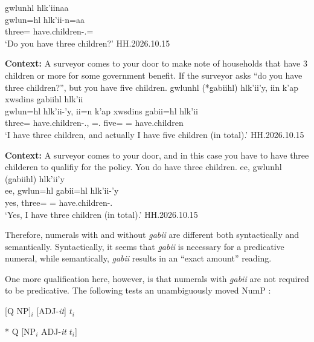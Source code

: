 \documentclass{article}
\begin{document}
\begin{exe}
    \ex 
    \begin{xlist}
        \item \glll gwlunhl hlk'iinaa \\
    gwlun=hl hlk'ii-n=aa \\
    three=\Cn{} have.children-\Ssg{}.\Ii{}=\Q{} \\
    `Do you have three children?' \hfill HH.2026.10.15
       \item \textbf{Context:} A surveyor comes to your door to make note of households that have 3 children or more for some government benefit. If the surveyor asks ``do you have three children?'', but you have five children. 
        \glll gwlunhl (*g̱abiihl) hlk'ii'y, iin k'ap xwsdins g̱abiihl hlk'ii  \\
    gwlun=hl hlk'ii-'y, ii=n k'ap xwsdins g̱abii=hl hlk'ii  \\
    three=\Cn{} have.children-\Fsg{}.\Ii{}, \Ccnj{}=\Fsg{}.\I{} \Verum{} five=\Cn{} \Cnt{}=\Cn{} have.children \\
    `I have three children, and actually I have five children (in total).' \hfill HH.2026.10.15
    \item \textbf{Context:} A surveyor comes to your door, and in this case you have to have three childeren to qualifiy for the policy. You do have three children. 
        \glll ee, gwlunhl (g̱abiihl) hlk'ii'y \\
    ee, gwlun=hl g̱abii=hl hlk'ii-'y \\
    yes, three=\Cn{} \Cnt{}=\Cn{} have.children-\Fsg{}.\Ii{} \\
    `Yes, I have three children (in total).' \hfill HH.2026.10.15
    \end{xlist}
\end{exe}

Therefore, numerals with and without \textit{g̱abii} are different both syntactically and semantically. Syntactically, it seems that \textit{g̱abii} is necessary for a predicative numeral, while semantically, \textit{g̱abii} results in an ``exact amount'' reading.

One more qualification here, however, is that numerals with \textit{g̱abii} are not required to be predicative. The following tests an unambiguously moved NumP \parencite{forbesAdjectives2012}:

\begin{exe}
    \ex \begin{xlist}
        \item {} [Q NP]$_{i}$ [ADJ-\textit{it}] $t_{i}$
        \item {} * Q [NP$_{i}$ ADJ-\textit{it} $t_{i}$]
    \end{xlist}
\end{exe}
\end{document}
